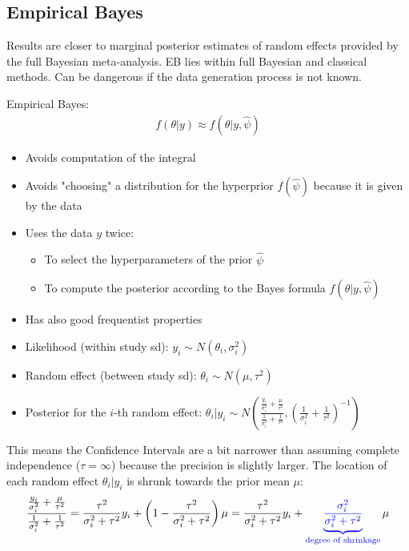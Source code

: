 \documentclass{article}\usepackage[]{graphicx}\usepackage[]{xcolor}
\begin{document}
\begin{multicols*}{2}
\subsection{Empirical Bayes}
Results are closer to marginal posterior estimates of random effects provided by the full Bayesian meta-analysis. EB lies within full Bayesian and classical methods. Can be dangerous if the data generation process is not known.

Empirical Bayes:
\begin{align*}
\boxed{f(\theta|y)\approx f(\theta|y,\hat{\psi})}
\end{align*}

\begin{itemize}
\item Avoids computation of the integral
\item Avoids "choosing" a distribution for the hyperprior $f(\hat{\psi})$ because it is given by the data 
\item Uses the data $y$ twice:
\begin{itemize}
  \item To select the hyperparameters of the prior $\hat{\psi}$
  \item To compute the posterior according to the Bayes formula $f(\theta|y,\hat{\psi})$
\end{itemize}
\item Has also good frequentist properties
\end{itemize}
\begin{itemize}
\item Likelihood (within study sd): $y_i\sim N(\theta_i,\sigma_i^2)$
\item Random effect (between study sd): $\theta_i\sim N(\mu,\tau^2)$
\item Posterior for the $i$-th random effect: $\boxed{\theta_i|y_i\sim N\left(\frac{\frac{y_i}{\sigma_i^2}+\frac{\mu}{\tau^2}}{\frac{1}{\sigma_i^2}+\frac{1}{\tau^2}}, \left(\frac{1}{\sigma_i^2}+\frac{1}{\tau^2}\right)^{-1}\right)}$
\end{itemize}
This means the Confidence Intervals are a bit narrower than assuming complete independence ($\tau=\infty$) because the precision is slightly larger. The location of each random effect $\theta_i|y_i$ is shrunk towards the prior mean $\mu$:
\begin{align*}
\frac{\frac{y_i}{\sigma_i^2}+\frac{\mu}{\tau^2}}{\frac{1}{\sigma_i^2}+\frac{1}{\tau^2}}=\frac{\tau^2}{\sigma_i^2+\tau^2}y_i+\left(1-\frac{\tau^2}{\sigma_i^2+\tau^2}\right)\mu=\frac{\tau^2}{\sigma_i^2+\tau^2}y_i+\color{blue}\underbrace{\frac{\sigma_i^2}{\sigma_i^2+\tau^2}}_{\text{degree of shrinkage}}\color{black}\mu
\end{align*}


\end{multicols*}
\end{document}
